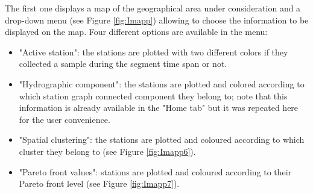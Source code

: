 The first one displays a map of the geographical area under consideration and a drop-down menu (see Figure \ref{fig:Imapp}) allowing to choose the information to be displayed on the map. Four different options are available in the menu:
\begin{itemize}
\item "Active station": the stations are plotted with two different colors if they collected a sample during the segment time span or not.
\item "Hydrographic component": the stations are plotted and colored according to which station graph connected component they belong to; note that this information is already available in the "Home tab" but it was repeated here for the user convenience.
\item "Spatial clustering":  the stations are plotted and coloured according to which cluster they belong to (see Figure \ref{fig:Imapp6}).
\item "Pareto front values": stations are plotted and coloured according to their Pareto front level (see Figure \ref{fig:Imapp7}). 
\end{itemize}
   
